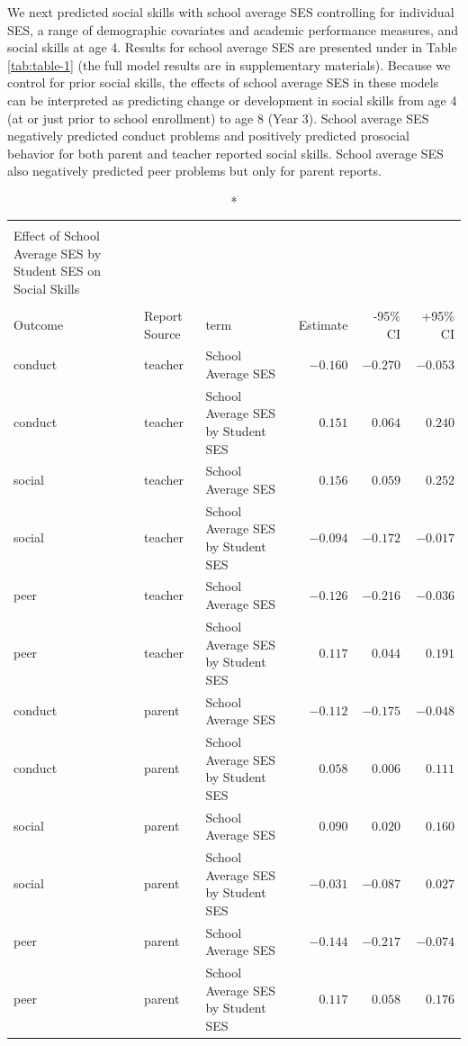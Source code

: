 \documentclass[
  english,
  man]{apa6}
\begin{document}
We next predicted social skills with school average SES controlling for individual SES, a range of demographic covariates and academic performance measures, and social skills at age 4. Results for school average SES are presented under in Table \ref{tab:table-1} (the full model results are in supplementary materials). Because we control for prior social skills, the effects of school average SES in these models can be interpreted as predicting change or development in social skills from age 4 (at or just prior to school enrollment) to age 8 (Year 3). School average SES negatively predicted conduct problems and positively predicted prosocial behavior for both parent and teacher reported social skills. School average SES also negatively predicted peer problems but only for parent reports.

\captionsetup[table]{labelformat=empty,skip=1pt}
\begin{longtable}{lllrrr}
\caption*{
\large Table 2\\ 
\small Effect of School Average SES by Student SES on Social Skills\\ 
} \\ 
\toprule
Outcome & Report Source & term & Estimate & -95\% CI & +95\% CI \\ 
\midrule
conduct & teacher & School Average SES & $-0.160$ & $-0.270$ & $-0.053$ \\ 
conduct & teacher & School Average SES by Student SES & $0.151$ & $0.064$ & $0.240$ \\ 
social & teacher & School Average SES & $0.156$ & $0.059$ & $0.252$ \\ 
social & teacher & School Average SES by Student SES & $-0.094$ & $-0.172$ & $-0.017$ \\ 
peer & teacher & School Average SES & $-0.126$ & $-0.216$ & $-0.036$ \\ 
peer & teacher & School Average SES by Student SES & $0.117$ & $0.044$ & $0.191$ \\ 
conduct & parent & School Average SES & $-0.112$ & $-0.175$ & $-0.048$ \\ 
conduct & parent & School Average SES by Student SES & $0.058$ & $0.006$ & $0.111$ \\ 
social & parent & School Average SES & $0.090$ & $0.020$ & $0.160$ \\ 
social & parent & School Average SES by Student SES & $-0.031$ & $-0.087$ & $0.027$ \\ 
peer & parent & School Average SES & $-0.144$ & $-0.217$ & $-0.074$ \\ 
peer & parent & School Average SES by Student SES & $0.117$ & $0.058$ & $0.176$ \\ 
\bottomrule
\end{longtable}
\end{document}
